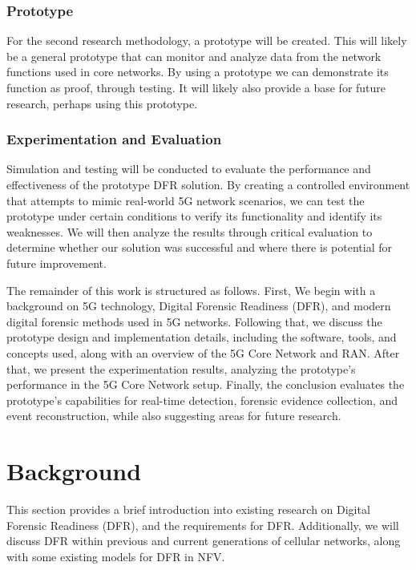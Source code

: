 \documentclass[final,1p,times,authoryear]{elsarticle}
\begin{document}
\subsubsection{Prototype}
\label{sub1sub6sec2}
For the second research methodology, a prototype will be created. This will likely be a general prototype that can monitor and analyze data from the network functions used in core networks. By using a prototype we can demonstrate its function as proof, through testing. It will likely also provide a base for future research, perhaps using this prototype.

\subsubsection{Experimentation and Evaluation}
\label{sub1sub6sec3}
Simulation and testing will be conducted to evaluate the performance and effectiveness of the prototype DFR solution. By creating a controlled environment that attempts to mimic real-world 5G network scenarios, we can test the prototype under certain conditions to verify its functionality and identify its weaknesses. We will then analyze the results through critical evaluation to determine whether our solution was successful and where there is potential for future improvement.

\vspace{1em}

The remainder of this work is structured as follows. First, We begin with a background on 5G technology, Digital Forensic Readiness (DFR), and modern digital forensic methods used in 5G networks. Following that, we discuss the prototype design and implementation details, including the software, tools, and concepts used, along with an overview of the 5G Core Network and RAN. After that, we present the experimentation results, analyzing the prototype's performance in the 5G Core Network setup. Finally, the conclusion evaluates the prototype’s capabilities for real-time detection, forensic evidence collection, and event reconstruction, while also suggesting areas for future research.

\section{Background}
\label{sec2}
This section provides a brief introduction into existing research on Digital Forensic Readiness (DFR), and the requirements for DFR. Additionally, we will discuss DFR within previous and current generations of cellular networks, along with some existing models for DFR in NFV.
\end{document}
